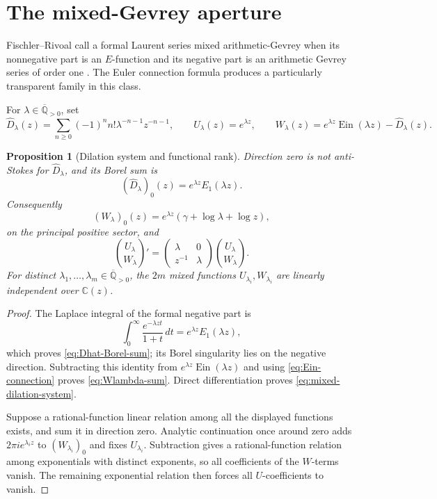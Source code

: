 \documentclass[11pt]{article}
\theoremstyle{keio}
\newtheorem{proposition}[theorem]{Proposition}
\theoremstyle{definition}
\theoremstyle{remark}
\newcommand{\Qbar}{\overline{\mathbb Q}}
\newcommand{\C}{\mathbb C}
\newcommand{\Ein}{\operatorname{Ein}}
\begin{document}
\section{The mixed-Gevrey aperture}
\label{sec:mixed-gevrey}

Fischler--Rivoal call a formal Laurent series mixed arithmetic-Gevrey when
its nonnegative part is an \(E\)-function and its negative part is an
arithmetic Gevrey series of order one
\cite{FischlerRivoalMixed2024}.  The Euler connection formula produces a
particularly transparent family in this class.

For \(\lambda\in\Qbar_{>0}\), set
\begin{equation}\label{eq:mixed-dilation-family}
 \widehat D_\lambda(z)=
 \sum_{n\ge0}(-1)^n n!\lambda^{-n-1}z^{-n-1},\qquad
 U_\lambda(z)=e^{\lambda z},\qquad
 W_\lambda(z)=e^{\lambda z}\Ein(\lambda z)-\widehat D_\lambda(z).
\end{equation}

\begin{proposition}[Dilation system and functional rank]
\label{prop:mixed-dilation-rank}
Direction zero is not anti-Stokes for \(\widehat D_\lambda\), and its
Borel sum is
\begin{equation}\label{eq:Dhat-Borel-sum}
 (\widehat D_\lambda)_0(z)=e^{\lambda z}E_1(\lambda z).
\end{equation}
Consequently
\begin{equation}\label{eq:Wlambda-sum}
 (W_\lambda)_0(z)=e^{\lambda z}
 (\gamma+\log\lambda+\log z),
\end{equation}
on the principal positive sector, and
\begin{equation}\label{eq:mixed-dilation-system}
 \binom{U_\lambda}{W_\lambda}'
 =\begin{pmatrix}\lambda&0\\z^{-1}&\lambda\end{pmatrix}
 \binom{U_\lambda}{W_\lambda}.
\end{equation}
For distinct \(\lambda_1,\ldots,\lambda_m\in\Qbar_{>0}\), the \(2m\)
mixed functions \(U_{\lambda_i},W_{\lambda_i}\) are linearly independent
over \(\C(z)\).
\end{proposition}

\begin{proof}
The Laplace integral of the formal negative part is
\[
 \int_0^\infty\frac{e^{-\lambda zt}}{1+t}\,dt
 =e^{\lambda z}E_1(\lambda z),
\]
which proves \eqref{eq:Dhat-Borel-sum}; its Borel singularity lies on the
negative direction.  Subtracting this identity from
\(e^{\lambda z}\Ein(\lambda z)\) and using
\eqref{eq:Ein-connection} proves \eqref{eq:Wlambda-sum}.  Direct
differentiation proves \eqref{eq:mixed-dilation-system}.

Suppose a rational-function linear relation among all the displayed
functions exists, and sum it in direction zero.  Analytic continuation once
around zero adds \(2\pi i e^{\lambda_i z}\) to
\((W_{\lambda_i})_0\) and fixes \(U_{\lambda_i}\).  Subtraction gives a
rational-function relation among exponentials with distinct exponents, so
all coefficients of the \(W\)-terms vanish.  The remaining exponential
relation then forces all \(U\)-coefficients to vanish.
\end{proof}
\end{document}
